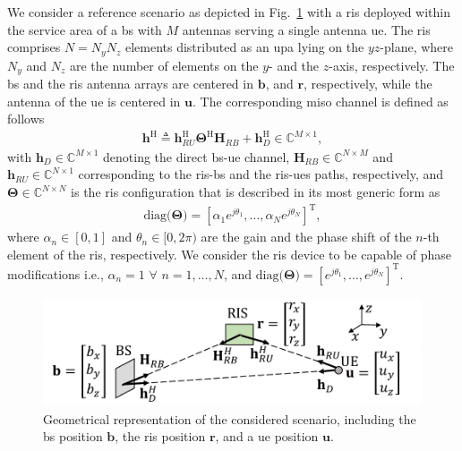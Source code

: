 \documentclass[10pt,journal,compsoc]{IEEEtran}
\newcommand{\ssub}[1]{{\scriptscriptstyle { #1}}}
\newcommand{\mb}[1]{\mathbf{{#1}}}
\newcommand{\tran}{\mathrm{T}}
\newcommand{\herm}{\mathrm{H}}
\newcommand{\diag}{\mathrm{diag}}
\begin{document}
We consider a reference scenario as depicted in Fig.~\ref{fig:system_model} with a \gls{ris} deployed within the service area of a \gls{bs} with $M$ antennas serving a single antenna \gls{ue}.
The \gls{ris} comprises $N = N_y N_z$ elements distributed as an \gls{upa} lying on the $yz$-plane, where $N_y$ and $N_z$ are the number of elements on the $y$- and the $z$-axis, respectively.
The \gls{bs} and the \gls{ris} antenna arrays are centered in $\mb{b}$, and $\mb{r}$, respectively, while the antenna of the \gls{ue} is centered in $\mb{u}$.
The corresponding \gls{miso} channel is defined as follows
\begin{align}
\label{eq:channel}
\mb{h}^{\herm} \triangleq  \mb{h}_{\ssub{RU}}^\herm \mb{\Theta}^\herm \mb{H}_{\ssub{RB}} + \mb{h}_{\ssub{D}}^\herm  \in \mathbb{C}^{M \times 1},
\end{align}
with $\mb{h}_{\ssub{D}} \in \mathbb{C}^{M \times 1}$ denoting the direct \gls{bs}-\gls{ue} channel, $\mb{H}_{\ssub{RB}} \in \mathbb{C}^{N \times M}$ and $\mb{h}_{\ssub{RU}} \in \mathbb{C}^{N \times 1}$ corresponding to the \gls{ris}-\gls{bs} and the \gls{ris}-\glspl{ue} paths, respectively, and $\mb{\Theta} \in \mathbb{C}^{N \times N}$ is 
the \gls{ris} configuration that is described in its  most generic form as
\begin{align}
    \diag{(\mb{\Theta}}) = [\alpha_1 e^{j\theta_1}, \dots, \alpha_{\ssub{N}} e^{j\theta_{\ssub{N}}} ]^\tran,
\end{align}
where $\alpha_n \in [0,1]$ and $\theta_n \in [0,2\pi)$ are the gain and the phase shift of the $n$-th element of the \gls{ris}, respectively. We consider the \gls{ris} device to be capable of phase modifications i.e.,  $\alpha_n = 1 \,\, \forall \,\, n = 1, \dots, N$, and $ \diag{(\mb{\Theta}}) = [e^{j\theta_1}, \dots, e^{j\theta_{\ssub{N}}} ]^\tran$.


\begin{figure}[t]
        \center
        \includegraphics[width=.3569\textwidth, trim = {0cm .5cm 0cm 0cm}]{Figures/geometry_small_v2.pdf}
        \caption{\label{fig:system_model}
        Geometrical representation of the considered scenario, including the \gls{bs} position $\mb{b}$, the \gls{ris} position $\mb{r}$, and a \gls{ue} position $\mb{u}$.}
\end{figure}
\end{document}
